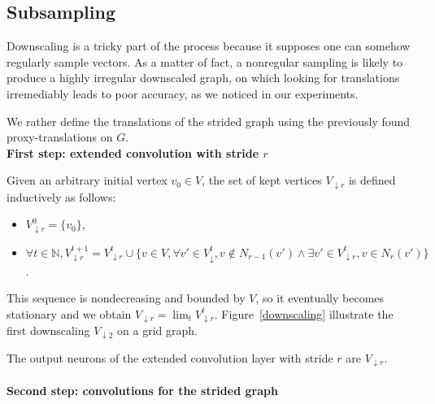 
\subsection{Subsampling}

Downscaling is a tricky part of the process because it supposes one can somehow regularly sample vectors. As a matter of fact, a nonregular sampling is likely to produce a highly irregular downscaled graph, on which looking for translations irremediably leads to poor accuracy, as we noticed in our experiments.%

We rather define the translations of the strided graph using the previously found proxy-translations on $G$.\\

\noindent\textbf{First step: extended convolution with stride $r$}

Given an arbitrary initial vertex $v_0 \in V$, the set of kept vertices $V_{\downarrow r}$ is defined inductively as follows:
\begin{itemize}[noitemsep,nolistsep]
\item $V_{\downarrow r}^0 = \{v_0\}$,
\item $\forall t \in \mathbb{N}, V_{\downarrow r}^{t+1} = V_{\downarrow r}^t \cup \{v \in V, \forall v' \in V_{\downarrow }^t, v \not\in N_{r-1}(v') \land \exists v' \in V_{\downarrow r}^t, v \in N_{r}(v') \}$.
\end{itemize}

This sequence is nondecreasing and bounded by $V$, so it eventually becomes stationary and we obtain $V_{\downarrow r} = \lim_t{V_{\downarrow r}^t}$. Figure~\ref{downscaling} illustrate the first downscaling $V_{\downarrow 2}$ on a grid graph. %

The output neurons of the extended convolution layer with stride $r$ are $V_{\downarrow r}$.

\paragraph{Second step: convolutions for the strided graph}

